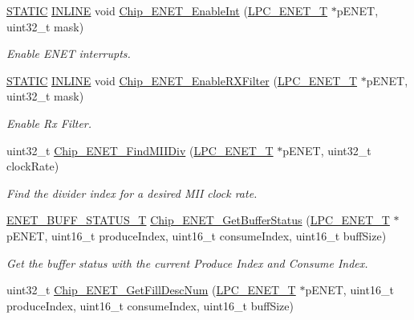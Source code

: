 \begin{DoxyCompactItemize}
\hyperlink{group__LPC__Types__Public__Macros_ga10b2d890d871e1489bb02b7e70d9bdfb}{S\+T\+A\+T\+IC} \hyperlink{group__LPC__Types__Public__Types_ga2eb6f9e0395b47b8d5e3eeae4fe0c116}{I\+N\+L\+I\+NE} void \hyperlink{group__ENET__17XX__40XX_gac0afbb3c822a9e581416fd500b922313}{Chip\+\_\+\+E\+N\+E\+T\+\_\+\+Enable\+Int} (\hyperlink{structLPC__ENET__T}{L\+P\+C\+\_\+\+E\+N\+E\+T\+\_\+T} $\ast$p\+E\+N\+ET, uint32\+\_\+t mask)
\begin{DoxyCompactList}\small\item\em Enable E\+N\+ET interrupts. \end{DoxyCompactList}\item 
\hyperlink{group__LPC__Types__Public__Macros_ga10b2d890d871e1489bb02b7e70d9bdfb}{S\+T\+A\+T\+IC} \hyperlink{group__LPC__Types__Public__Types_ga2eb6f9e0395b47b8d5e3eeae4fe0c116}{I\+N\+L\+I\+NE} void \hyperlink{group__ENET__17XX__40XX_ga87335faab88d9a16579596f4a0a6ce14}{Chip\+\_\+\+E\+N\+E\+T\+\_\+\+Enable\+R\+X\+Filter} (\hyperlink{structLPC__ENET__T}{L\+P\+C\+\_\+\+E\+N\+E\+T\+\_\+T} $\ast$p\+E\+N\+ET, uint32\+\_\+t mask)
\begin{DoxyCompactList}\small\item\em Enable Rx Filter. \end{DoxyCompactList}\item 
uint32\+\_\+t \hyperlink{group__ENET__17XX__40XX_gad107338dec5ee221957fafe5e711e42e}{Chip\+\_\+\+E\+N\+E\+T\+\_\+\+Find\+M\+I\+I\+Div} (\hyperlink{structLPC__ENET__T}{L\+P\+C\+\_\+\+E\+N\+E\+T\+\_\+T} $\ast$p\+E\+N\+ET, uint32\+\_\+t clock\+Rate)
\begin{DoxyCompactList}\small\item\em Find the divider index for a desired M\+II clock rate. \end{DoxyCompactList}\item 
\hyperlink{group__ENET__17XX__40XX_gab29d71439401a8d4f68643acfd10959b}{E\+N\+E\+T\+\_\+\+B\+U\+F\+F\+\_\+\+S\+T\+A\+T\+U\+S\+\_\+T} \hyperlink{group__ENET__17XX__40XX_gafed5419d7a6be4580641e557429a63ad}{Chip\+\_\+\+E\+N\+E\+T\+\_\+\+Get\+Buffer\+Status} (\hyperlink{structLPC__ENET__T}{L\+P\+C\+\_\+\+E\+N\+E\+T\+\_\+T} $\ast$p\+E\+N\+ET, uint16\+\_\+t produce\+Index, uint16\+\_\+t consume\+Index, uint16\+\_\+t buff\+Size)
\begin{DoxyCompactList}\small\item\em Get the buffer status with the current Produce Index and Consume Index. \end{DoxyCompactList}\item 
uint32\+\_\+t \hyperlink{group__ENET__17XX__40XX_gac5f44f20f55847c4c9b9906f051aeca3}{Chip\+\_\+\+E\+N\+E\+T\+\_\+\+Get\+Fill\+Desc\+Num} (\hyperlink{structLPC__ENET__T}{L\+P\+C\+\_\+\+E\+N\+E\+T\+\_\+T} $\ast$p\+E\+N\+ET, uint16\+\_\+t produce\+Index, uint16\+\_\+t consume\+Index, uint16\+\_\+t buff\+Size)

\end{DoxyCompactItemize}
